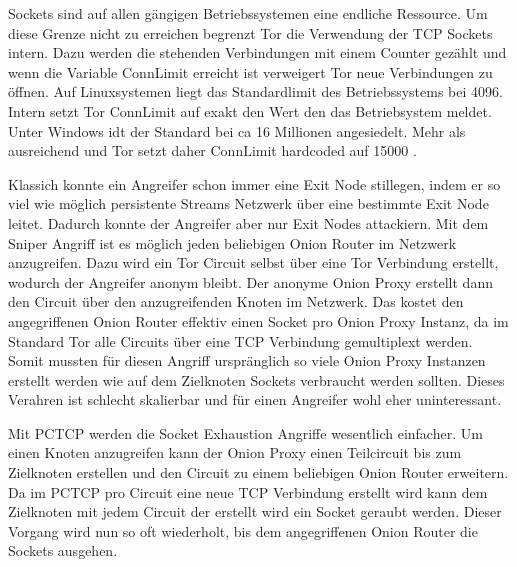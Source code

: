 \documentclass[fleqn,envcountsame,runningheads,10pt,a4paper]{llncs}
\begin{document}
Sockets sind auf allen gängigen Betriebssystemen eine endliche Ressource. Um diese Grenze nicht zu erreichen begrenzt Tor die Verwendung der TCP Sockets intern. Dazu werden die stehenden Verbindungen mit einem Counter gezählt und wenn die Variable ConnLimit erreicht ist verweigert Tor neue Verbindungen zu öffnen. Auf Linuxsystemen liegt das Standardlimit des Betriebssystems bei 4096. Intern setzt Tor ConnLimit auf exakt den Wert den das Betriebsystem meldet. Unter Windows idt der Standard bei ca 16 Millionen angesiedelt. Mehr als ausreichend und Tor setzt daher ConnLimit hardcoded auf 15000 \cite{imux}.

Klassich konnte ein Angreifer schon immer eine Exit Node stillegen, indem er so viel wie möglich persistente Streams Netzwerk über eine bestimmte Exit Node leitet. Dadurch konnte der Angreifer aber nur Exit Nodes attackiern. Mit dem Sniper Angriff \cite{sniper} ist es möglich jeden beliebigen Onion Router im Netzwerk anzugreifen. Dazu wird ein Tor Circuit selbst über eine Tor Verbindung erstellt, wodurch der Angreifer anonym bleibt. Der anonyme Onion Proxy erstellt dann den Circuit über den anzugreifenden Knoten im Netzwerk. Das kostet den angegriffenen Onion Router effektiv einen Socket pro Onion Proxy Instanz, da im Standard Tor alle Circuits über eine TCP Verbindung gemultiplext werden. Somit mussten für diesen Angriff urspränglich so viele Onion Proxy Instanzen erstellt werden wie auf dem Zielknoten Sockets verbraucht werden sollten. Dieses Verahren ist schlecht skalierbar und für einen Angreifer wohl eher uninteressant.

Mit PCTCP werden die Socket Exhaustion Angriffe wesentlich einfacher. Um einen Knoten anzugreifen kann der Onion Proxy einen Teilcircuit bis zum Zielknoten erstellen und den Circuit zu einem beliebigen Onion Router erweitern. Da im PCTCP pro Circuit eine neue TCP Verbindung erstellt wird kann dem Zielknoten mit jedem Circuit der erstellt wird ein Socket geraubt werden. Dieser Vorgang wird nun so oft wiederholt, bis dem angegriffenen Onion Router die Sockets ausgehen.
\end{document}
